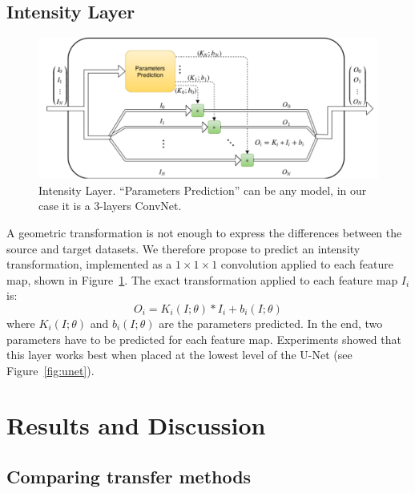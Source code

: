 \subsection{Intensity Layer}
\label{ssec:intensity_transfo}

\begin{figure}[htb]
	\includegraphics[width=\textwidth]{img_transfer/Intensity_Block}
    \caption{Intensity Layer. ``Parameters Prediction'' can be any model, in our case it is a 3-layers ConvNet.}
    \label{fig:block}
\end{figure}

A geometric transformation is not enough to express the differences between the source and target datasets. We therefore propose to predict an intensity transformation, implemented as a $1 \times 1 \times 1$ convolution applied to each feature map, shown in Figure~\ref{fig:block}. The exact transformation applied to each feature map $I_i$ is:
\begin{equation*}
O_i = K_i \left( I; \theta \right) * I_i + b_i \left( I; \theta \right)
\end{equation*}
where $K_i \left( I; \theta \right)$ and $b_i \left( I; \theta \right)$ are the parameters predicted. In the end, two parameters have to be predicted for each feature map. Experiments showed that this layer works best when placed at the lowest level of the U-Net (see Figure~\ref{fig:unet}).

\section{Results and Discussion}
\label{sec:kidney_res}

\subsection{Comparing transfer methods}

